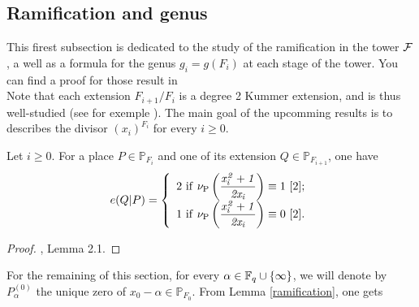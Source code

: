 \documentclass[10pt]{article}
\begin{document}
\s

\subsection{Ramification and genus}

\s

This firest subsection is dedicated to the study of the ramification in the tower $\mathcal{F}$, a well as a formula for the genus $g_i = g(F_i)$ at each stage of the tower. You can find a proof for those result in \cite{NOQ} \\
Note that each extension $F_{i+1}/F_{i}$ is a degree 2 Kummer extension, and is thus well-studied (see for exemple \cite{Sti}). The main goal of the upcomming results is to describes the divisor $(x_i)^{F_i}$ for every $i \geq 0$.

\s

\begin{lemma} \label{ramification}
Let $i \geq 0$. For a place $P \in \mathbb{P}_{F_i}$ and one of its extension $Q \in \mathbb{P}_{F_{i+1}}$, one have 
\begin{equation*}
e(Q|P) = \left\{ \begin{array}{ll}
2 \ \rm if \  \nu_P\left(\it \dfrac{x_i^2+1}{2x_i}\right) \rm \equiv 1 \ [2] ;\\
1 \ \rm if \  \nu_P\left(\it \dfrac{x_i^2+1}{2x_i}\right) \rm \equiv 0  \ [2]. 
\end{array}
\right.
\end{equation*}
\end{lemma}

\s

\begin{proof}
\cite{NOQ}, Lemma 2.1.
\end{proof}

\s

For the remaining of this section, for every $\alpha \in \mathbb{F}_q \cup \{\infty\}$, we will denote by $P_{\alpha}^{(0)}$ the unique zero of $x_0-\alpha \in \mathbb{P}_{F_0}$. From Lemma \ref{ramification}, one gets

\s
\end{document}
